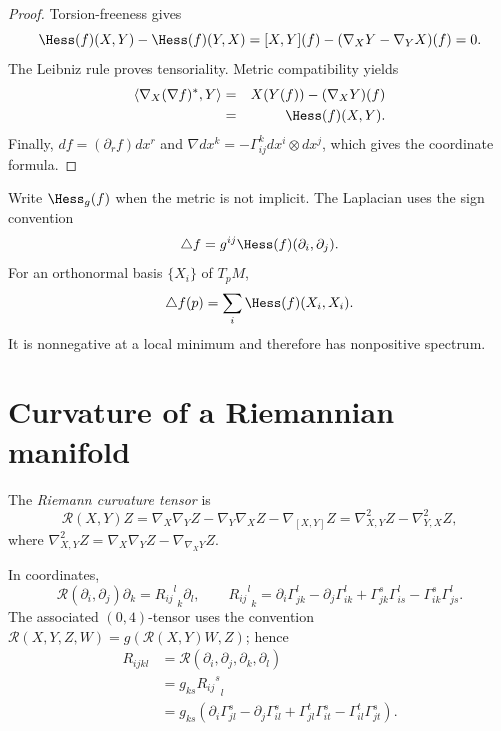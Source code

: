 \begin{proof}
\sketch
\leanok
{}
Torsion-freeness gives
\[
  \Hess(f)(X,Y)-\Hess(f)(Y,X)
  =[X,Y](f)-(\nabla_XY-\nabla_YX)(f)=0.
\]
The Leibniz rule proves tensoriality. Metric compatibility yields
\begin{eqnarray}\label{hessform}
\langle\nabla_X(\nabla f)^*,Y\rangle
&=&X(Y(f))-(\nabla_XY)(f)\\
&=&\Hess(f)(X,Y).\nonumber
\end{eqnarray}
Finally, $df=(\partial_rf)dx^r$ and
$\nabla dx^k=-\Gamma^k_{ij}dx^i\otimes dx^j$, which gives the
coordinate formula.
\end{proof}

Write $\Hess_g(f)$ when the metric is not implicit. The Laplacian uses
the sign convention
\[
  \triangle f=g^{ij}\Hess(f)(\partial_i,\partial_j).
\]
For an orthonormal basis $\{X_i\}$ of $T_pM$,
\begin{equation}\label{laplacformula}
  \triangle f(p)=\sum_i\Hess(f)(X_i,X_i).
\end{equation}
It is nonnegative at a local minimum and therefore has nonpositive
spectrum.

\section{Curvature of a Riemannian manifold}

\begin{definition}
\label{def:riemann-curvature-tensor}
\leanok



The \emph{Riemann curvature tensor} is
\[
  \mathcal R(X,Y)Z
  =\nabla_X\nabla_YZ-\nabla_Y\nabla_XZ-\nabla_{[X,Y]}Z
  =\nabla^2_{X,Y}Z-\nabla^2_{Y,X}Z,
\]
where $\nabla^2_{X,Y}Z=\nabla_X\nabla_YZ-\nabla_{\nabla_XY}Z$.
\end{definition}

In coordinates,
\[
  \mathcal R(\partial_i,\partial_j)\partial_k
  ={{R_{ij}}^l}_k\partial_l,
  \qquad
  {{R_{ij}}^l}_k
  =\partial_i\Gamma^l_{jk}-\partial_j\Gamma^l_{ik}
   +\Gamma^s_{jk}\Gamma^l_{is}-\Gamma^s_{ik}\Gamma^l_{js}.
\]
The associated $(0,4)$-tensor uses the convention
$\mathcal R(X,Y,Z,W)=g(\mathcal R(X,Y)W,Z)$; hence
\begin{align*}
  R_{ijkl}
  &=\mathcal R(\partial_i,\partial_j,\partial_k,\partial_l)\\
  &=g_{ks}{{R_{ij}}^s}_l\\
  &=g_{ks}(\partial_i\Gamma^s_{jl}-\partial_j\Gamma^s_{il}
    +\Gamma^t_{jl}\Gamma^s_{it}-\Gamma^t_{il}\Gamma^s_{jt}).
\end{align*}

